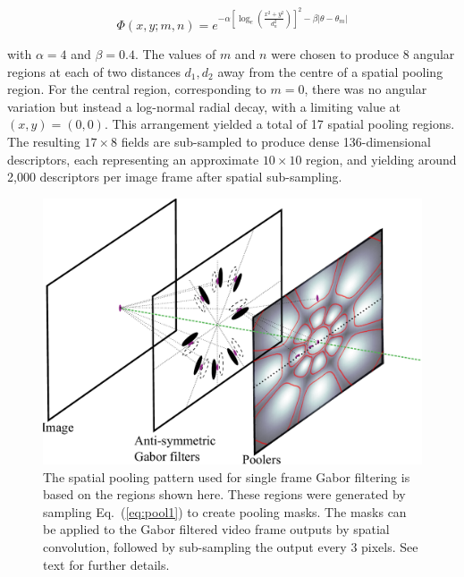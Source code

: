 \begin{equation}
\Phi(x,y;m,n) = e^{-\alpha \left [\log_e \left ( \frac{x^2+y^2}{d_n^2}\right ) \right ]^2 - \beta |\theta-\theta_m | }
\label{eq:pool1}
\end{equation}

\noindent with $\alpha = 4$ and $\beta = 0.4$. The values of $m$ and $n$ were chosen to produce 8 angular regions at each of two distances $d_1, d_2$ away from the centre of a spatial pooling region.  For the central region, corresponding to $m=0$, there was no angular variation but instead a log-normal radial decay, with a limiting value at $(x,y)=(0,0)$. This arrangement yielded a total of  17 spatial pooling regions. The resulting $17 \times 8$ fields are sub-sampled to produce dense 136-dimensional descriptors, each representing an approximate $10 \times 10$ region, and yielding around 2,000 descriptors per image frame after spatial sub-sampling. 

\begin{figure}[t]
\centering
\includegraphics[width=0.7\linewidth]{./gfx/Chapter04/Layers.pdf}
\caption{The spatial pooling pattern used for single frame Gabor filtering is based on the regions shown here.  These regions were generated by sampling Eq.~(\ref{eq:pool1}) to create pooling masks. The masks can be applied to the Gabor filtered video frame outputs by spatial convolution, followed by sub-sampling the output every 3 pixels. See text for further details.}
\label{fig:IsoPool}
\end{figure}

